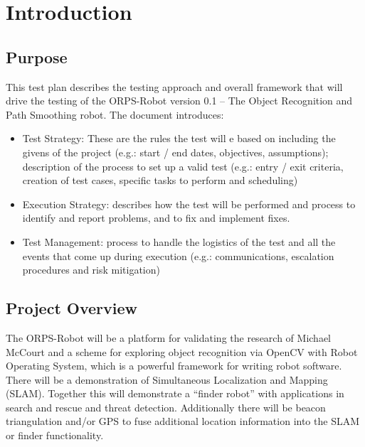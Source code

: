 \documentclass[english,12pt]{article}
\begin{document}
\section{Introduction}
\subsection{Purpose}
This test plan describes the testing approach and overall 
framework that will drive the testing of the ORPS-Robot 
version 0.1 – The Object Recognition and Path Smoothing 
robot. The document introduces:
\begin{itemize}
	\item[] Test Strategy: These are the rules the test will e based on including 
    the givens of the project (e.g.: start / end dates, objectives, assumptions); 
    description of the process to set up a valid test (e.g.: entry / exit criteria, 
    creation of test cases, specific tasks to perform and scheduling)
	\item[] Execution Strategy: describes how the test will be performed 
    and process to identify and report problems, and to fix and implement 
    fixes.
    \item[] Test Management: process to handle the logistics of the test 
    and all the events that come up during execution (e.g.: communications, 
    escalation procedures and risk mitigation)
\end{itemize}
\subsection{Project Overview}
The ORPS-Robot will be a platform for validating the research of Michael McCourt 
and a scheme for exploring object recognition via OpenCV with Robot Operating System, 
which is a powerful framework for writing robot software. There will be a demonstration 
of Simultaneous Localization and Mapping (SLAM). Together this will demonstrate a ``finder
robot'' with applications in search and rescue and threat detection. Additionally there 
will be beacon triangulation and/or GPS to fuse additional location information into the 
SLAM or finder functionality.
\end{document}
